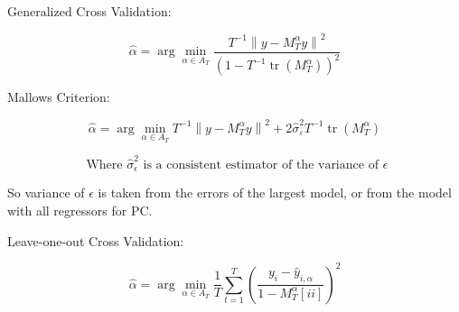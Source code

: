 Generalized Cross Validation:

\[\hat{\alpha}=\arg \min _{\alpha \in A_{T}} \frac{T^{-1}\left\|y-M_{T}^{\alpha} y\right\|^{2}}{\left(1-T^{-1} \operatorname{tr}\left(M_{T}^{\alpha}\right)\right)^{2}}\]

Mallows Criterion:

\[\hat{\alpha}=\arg \min _{\alpha \in A_{T}} T^{-1}\left\|y-M_{T}^{\alpha} y\right\|^{2}+2 \widehat{\sigma}_{\varepsilon}^{2} T^{-1} \operatorname{tr}\left(M_{T}^{\alpha}\right)\]

\[\text{ Where } \widehat{\sigma}_{\epsilon}^{2} \text{ is a consistent estimator of the variance of } \epsilon\]

So variance of $\epsilon$ is taken from the errors of the largest model, or from the model with all regressors for PC.

Leave-one-out Cross Validation:

\[\hat{\alpha}=\arg \min _{\alpha \in A_{T}} \frac{1}{T} \sum_{t=1}^{T}\left(\frac{y_{i}-\hat{y}_{i, \alpha}}{1-M_{T}^{\alpha}[ii]}\right)^{2}\]

\clearpage








